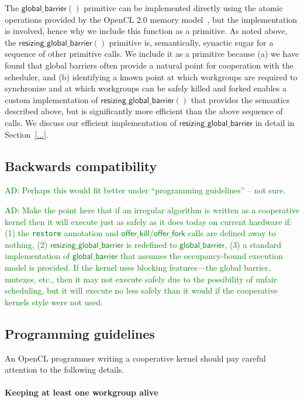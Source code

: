 \documentclass[nocopyrightspace]{sigplanconf-pldi16}
\newcommand{\ADComment}[1]{\textcolor{green}{AD: #1}}
\newcommand{\offerfork}{\mathsf{offer\_fork}}
\newcommand{\offerkill}{\mathsf{offer\_kill}}
\newcommand{\globalbarrier}{\mathsf{global\_barrier}}
\newcommand{\resizingglobalbarrier}{\mathsf{resizing\_global\_barrier}}
\begin{document}
The $\globalbarrier()$ primitive can be implemented directly using the
atomic operations provided by the OpenCL 2.0 memory model~\cite{...},
but the implementation is involved, hence why we include this function
as a primitive.  As noted above, the $\resizingglobalbarrier()$
primitive is, semantically, synactic sugar for a sequence of other
primitive calls.  We include it as a primitive because (a) we have
found that global barriers often provide a natural point for
cooperation with the scheduler, and (b) identifying a known point at
which workgroups are required to synchronize and at which workgroups
can be safely killed and forked enables a custom implementation of
$\resizingglobalbarrier()$ that provides the semantics described
above, but is significantly more efficient than the above sequence of
calls.  We discuss our efficient implementation of
$\resizingglobalbarrier$ in detail in Section~\ref{...}.

\subsection{Backwards compatibility}

\ADComment{Perhaps this would fit better under ``programming guidelines'' -- not sure.}

\ADComment{Make the point here that if an irregular algorithm is
  written as a cooperative kernel then it will execute just as safely
  as it does today on current hardware if: (1) the \texttt{restore}
  annotation and $\offerkill$/$\offerfork$ calls are defined away to
  nothing, (2) $\resizingglobalbarrier$ is redefined to
  $\globalbarrier$, (3) a standard implementation of $\globalbarrier$
  that assumes the occupancy-bound execution model is provided.  If the kernel uses blocking features---the global barrier, mutexes, etc., then it may not execute safely due to the possibility of unfair scheduling, but it will execute no less safely than it would if the cooperative kernels style were not used.}

\subsection{Programming guidelines}

An OpenCL programmer writing a cooperative kernel should pay careful
attention to the following details.

\paragraph{Keeping at least one workgroup alive}
\end{document}
